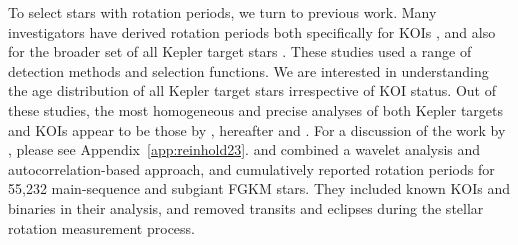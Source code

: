 \documentclass[11pt,twocolumn,tighten]{aastex63}
\begin{document}
To select stars with rotation periods, we turn to previous work.  Many
investigators have derived rotation periods both specifically for KOIs
\citep{McQuillan_2013,Walkowicz_2013,Mazeh_2015,Angus_2018,David_2021},
and also for the broader set of all Kepler target stars
\citep{McQuillan_2014,Reinhold_2015,Santos_2019,Santos_2021,Reinhold2023}.
These studies used a range of detection methods and selection
functions.  We are interested in understanding the age distribution of
all Kepler target stars irrespective of KOI status.  Out of these
studies, the most homogeneous and precise analyses of both Kepler
targets and KOIs appear to be those by
\citet{Santos_2019,Santos_2021}, hereafter 
and .  
For a discussion of the work by \citet{Reinhold2023}, please see
Appendix~\ref{app:reinhold23}.
 and
 combined a wavelet analysis and
autocorrelation-based approach, and cumulatively reported rotation
periods for 55{,}232 main-sequence and subgiant FGKM stars.  They
included known KOIs and binaries in their analysis, and removed
transits and eclipses during the stellar rotation measurement process. 

\end{document}
